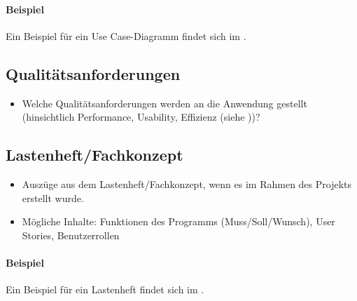 \paragraph{Beispiel}
Ein Beispiel für ein Use Case-Diagramm findet sich im .


\subsection{Qualitätsanforderungen}
\label{sec:Qualitaetsanforderungen}
\begin{itemize}
	\item Welche Qualitätsanforderungen werden an die Anwendung gestellt (\zB hinsichtlich Performance, Usability, Effizienz \etc (siehe \citet{ISO9126}))?
\end{itemize}


\subsection{Lastenheft/Fachkonzept}
\label{sec:Lastenheft}
\begin{itemize}
	\item Auszüge aus dem Lastenheft/Fachkonzept, wenn es im Rahmen des Projekts erstellt wurde.
	\item Mögliche Inhalte: Funktionen des Programms (Muss/Soll/Wunsch), User Stories, Benutzerrollen
\end{itemize}

\paragraph{Beispiel}
Ein Beispiel für ein Lastenheft findet sich im . 
